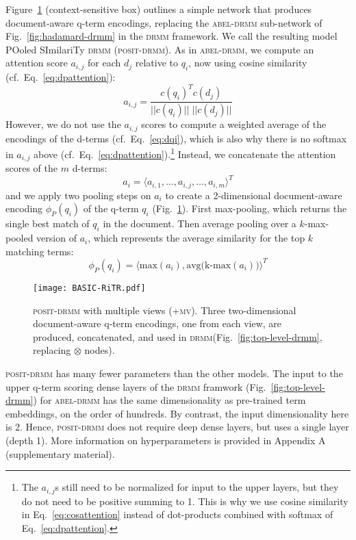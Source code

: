 \documentclass[11pt,a4paper]{article}
\newcommand{\drmm}{\textsc{drmm}\xspace}
\newcommand{\abeldrmm}{\textsc{abel-drmm}\xspace}
\newcommand{\positdrmm}{\textsc{posit-drmm}\xspace}
\begin{document}
Figure~\ref{fig:basic-ritr} (context-sensitive box) outlines a simple network that produces document-aware q-term encodings, 
replacing the \abeldrmm sub-network of Fig.~\ref{fig:hadamard-drmm} in the \drmm framework.
We call the resulting model POoled SImilariTy \drmm 
(\positdrmm). As in 
\abeldrmm, we compute an attention score $a_{i,j}$ for each $d_j$ relative to $q_i$, now using cosine similarity (cf.\ Eq.~\ref{eq:dpattention}):
\begin{equation}
a_{i,j} = 
\frac{c(q_i)^T c(d_j)}{||c(q_i)|| \; ||c(d_j)||}
\label{eq:cosattention}
\end{equation}
However, we do not use the $a_{i,j}$ scores to compute a weighted average of the encodings of the d-terms 
(cf.\ Eq.~\ref{eq:dqi}), which is also why there is no softmax in $a_{i,j}$ above (cf.\ Eq.~\ref{eq:dpattention}).\footnote{The $a_{i,j}$s still need to be normalized for input to the upper layers, but they do not need to be positive summing to 1. This is why we use cosine similarity in Eq.~\ref{eq:cosattention} instead of dot-products combined with softmax of Eq.~\ref{eq:dpattention}. } 
Instead, we concatenate the attention scores of the $m$ d-terms:
\[
a_i = \langle a_{i,1}, \dots, a_{i,j}, \dots, a_{i,m} \rangle^T
\]
and we apply two pooling steps on $a_i$ to create a 2-dimensional document-aware encoding $\phi_P(q_i)$ of the q-term $q_i$ (Fig.~\ref{fig:basic-ritr}). First max-pooling, which returns the single best match of $q_i$ in the document. Then average pooling over a $k$-max-pooled version of $a_i$, which represents the average similarity for the top $k$ matching terms: 
\[
\phi_P(q_i) = 
\Big\langle\mbox{max}(a_i), \textrm{avg}\Big(\mbox{k-max}(a_i)\Big)\Big\rangle^T
\]

\begin{figure}[t]
\texttt{[image: BASIC-RiTR.pdf]}
\vspace{-0.15in}
\caption{\positdrmm with multiple views (\textsc{+mv}). Three two-dimensional document-aware q-term encodings, one from each view, are produced, concatenated, and used in \drmm (Fig.~\ref{fig:top-level-drmm}, replacing $\otimes$ nodes).}
\vspace{-4mm}
\label{fig:basic-ritr}
\end{figure}

\positdrmm has many fewer parameters than the other models. The input to the upper q-term scoring dense layers of the \drmm framwork (Fig.~\ref{fig:top-level-drmm}) for \abeldrmm has the same dimensionality as pre-trained term embeddings, on the order of hundreds. By contrast, the input dimensionality here is 2. 
Hence, \positdrmm does not require deep dense layers, but uses a single layer (depth 1).
More information on hyperparameters is provided in Appendix A (supplementary material).
\end{document}
